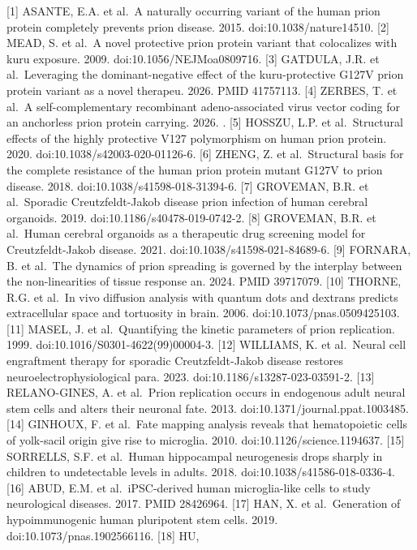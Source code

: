 \documentclass[
  12pt,
]{report}
\begin{document}
{[}1{]} ASANTE, E.A. et al.~A naturally occurring variant of the human
prion protein completely prevents prion disease. 2015.
doi:10.1038/nature14510. {[}2{]} MEAD, S. et al.~A novel protective
prion protein variant that colocalizes with kuru exposure. 2009.
doi:10.1056/NEJMoa0809716. {[}3{]} GATDULA, J.R. et al.~Leveraging the
dominant-negative effect of the kuru-protective G127V prion protein
variant as a novel therapeu. 2026. PMID 41757113. {[}4{]} ZERBES, T. et
al.~A self-complementary recombinant adeno-associated virus vector
coding for an anchorless prion protein carrying. 2026. . {[}5{]} HOSSZU,
L.P. et al.~Structural effects of the highly protective V127
polymorphism on human prion protein. 2020.
doi:10.1038/s42003-020-01126-6. {[}6{]} ZHENG, Z. et al.~Structural
basis for the complete resistance of the human prion protein mutant
G127V to prion disease. 2018. doi:10.1038/s41598-018-31394-6. {[}7{]}
GROVEMAN, B.R. et al.~Sporadic Creutzfeldt-Jakob disease prion infection
of human cerebral organoids. 2019. doi:10.1186/s40478-019-0742-2.
{[}8{]} GROVEMAN, B.R. et al.~Human cerebral organoids as a therapeutic
drug screening model for Creutzfeldt-Jakob disease. 2021.
doi:10.1038/s41598-021-84689-6. {[}9{]} FORNARA, B. et al.~The dynamics
of prion spreading is governed by the interplay between the
non-linearities of tissue response an. 2024. PMID 39717079. {[}10{]}
THORNE, R.G. et al.~In vivo diffusion analysis with quantum dots and
dextrans predicts extracellular space and tortuosity in brain. 2006.
doi:10.1073/pnas.0509425103. {[}11{]} MASEL, J. et al.~Quantifying the
kinetic parameters of prion replication. 1999.
doi:10.1016/S0301-4622(99)00004-3. {[}12{]} WILLIAMS, K. et al.~Neural
cell engraftment therapy for sporadic Creutzfeldt-Jakob disease restores
neuroelectrophysiological para. 2023. doi:10.1186/s13287-023-03591-2.
{[}13{]} RELANO-GINES, A. et al.~Prion replication occurs in endogenous
adult neural stem cells and alters their neuronal fate. 2013.
doi:10.1371/journal.ppat.1003485. {[}14{]} GINHOUX, F. et al.~Fate
mapping analysis reveals that hematopoietic cells of yolk-sacil origin
give rise to microglia. 2010. doi:10.1126/science.1194637. {[}15{]}
SORRELLS, S.F. et al.~Human hippocampal neurogenesis drops sharply in
children to undetectable levels in adults. 2018.
doi:10.1038/s41586-018-0336-4. {[}16{]} ABUD, E.M. et al.~iPSC-derived
human microglia-like cells to study neurological diseases. 2017. PMID
28426964. {[}17{]} HAN, X. et al.~Generation of hypoimmunogenic human
pluripotent stem cells. 2019. doi:10.1073/pnas.1902566116. {[}18{]} HU,
\end{document}
